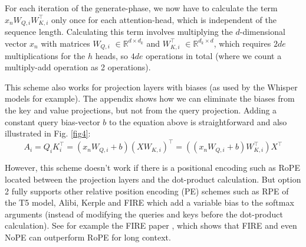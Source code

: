 \documentclass{article}
\newcommand{\eR}[2]{$\in \mathbb{R}^{#1 \times #2}$} %
\begin{document}
For each iteration of the generate-phase, we now have to calculate the term $x_n W_{Q,i} W_{K,i}^\top$ only once for each attention-head, which is independent of the sequence length. Calculating this term involves multiplying the $d$-dimensional vector $x_n$ with matrices $W_{Q,i}$ \eR{d}{d_k} and $W_{K,i}^\top$ \eR{d_k}{d}, which requires $2 d e$ multiplications for the $h$ heads, so $4 d e$ operations in total (where we count a multiply-add operation as 2 operations).

This scheme also works for projection layers with biases (as used by the Whisper models for example). The appendix shows how we can eliminate the biases from the key and value projections, but not from the query projection. Adding a constant query bias-vector $b$ to the equation above is straightforward and also illustrated in Fig. \ref{fig4}:
\begin{equation*}
  A_i = Q_i K_i^\top = (x_n W_{Q,i} + b) (X W_{K,i})^\top = ((x_n W_{Q,i} + b) W_{K,i}^\top) X^\top
\end{equation*}

However, this scheme doesn’t work if there is a positional encoding such as RoPE located between the projection layers and the dot-product calculation. But option 2 fully supports other relative position encoding (PE) schemes such as RPE of the T5 model, Alibi, Kerple and FIRE \citep{FIRE} which add a variable bias to the softmax arguments (instead of modifying the queries and keys before the dot-product calculation). See for example the FIRE paper \citep{FIRE}, which shows that FIRE and even NoPE can outperform RoPE for long context.
\end{document}
